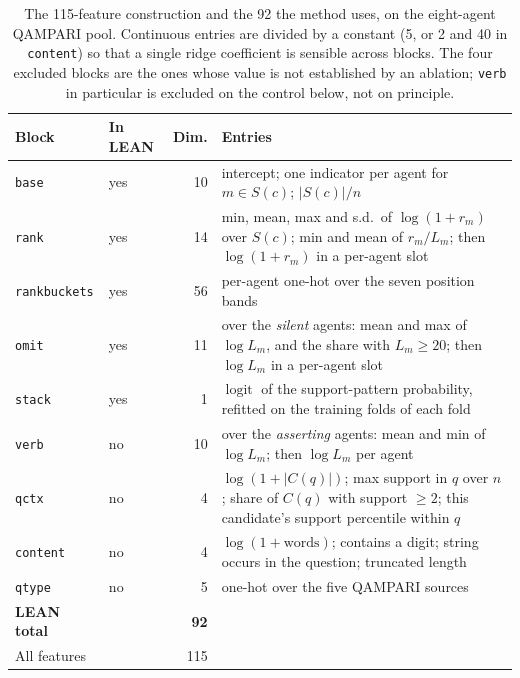 \documentclass[11pt]{article}
\begin{document}
\begin{table}[t]
  \caption{The 115-feature construction and the 92 the method uses, on the eight-agent QAMPARI pool. Continuous entries are divided by a constant (5, or 2 and 40 in \texttt{content}) so that a single ridge coefficient is sensible across blocks. The four excluded blocks are the ones whose value is not established by an ablation; \texttt{verb} in particular is excluded on the control below, not on principle.}
  \label{tab:blocks}
  \centering
  \begin{tabular}{llrp{6.1cm}}
    \toprule
    Block & In LEAN & Dim. & Entries \\
    \midrule
    \texttt{base}        & yes & 10 & intercept; one indicator per agent for $m \in S(c)$; $|S(c)|/n$ \\
    \texttt{rank}        & yes & 14 & min, mean, max and s.d.\ of $\log(1+r_m)$ over $S(c)$; min and mean of $r_m/L_m$; then $\log(1+r_m)$ in a per-agent slot \\
    \texttt{rankbuckets} & yes & 56 & per-agent one-hot over the seven position bands \\
    \texttt{omit}        & yes & 11 & over the \emph{silent} agents: mean and max of $\log L_m$, and the share with $L_m \geq 20$; then $\log L_m$ in a per-agent slot \\
    \texttt{stack}       & yes &  1 & $\operatorname{logit}$ of the support-pattern probability, refitted on the training folds of each fold \\
    \midrule
    \texttt{verb}        & no  & 10 & over the \emph{asserting} agents: mean and min of $\log L_m$; then $\log L_m$ per agent \\
    \texttt{qctx}        & no  &  4 & $\log(1+|C(q)|)$; max support in $q$ over $n$; share of $C(q)$ with support $\geq 2$; this candidate's support percentile within $q$ \\
    \texttt{content}     & no  &  4 & $\log(1+\text{words})$; contains a digit; string occurs in the question; truncated length \\
    \texttt{qtype}       & no  &  5 & one-hot over the five QAMPARI sources \\
    \midrule
    \textbf{LEAN total}  &     & \textbf{92} & \\
    All features         &     & 115 & \\
    \bottomrule
  \end{tabular}
\end{table}
\end{document}
